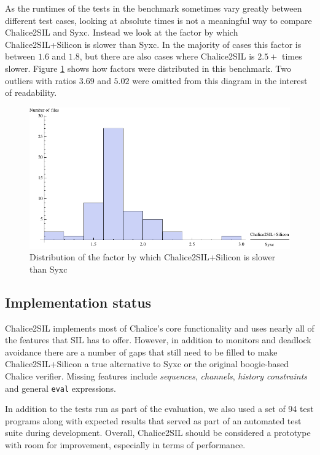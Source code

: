 As the runtimes of the tests in the benchmark sometimes vary greatly between different test cases, looking at absolute times is not a meaningful way to compare Chalice2SIL and Syxc. 
Instead we look at the factor by which Chalice2SIL+Silicon is slower than Syxc. 
In the majority of cases this factor is between $1.6$ and $1.8$, but there are also cases where Chalice2SIL is $2.5+$ times slower.
Figure \ref{fig:full-ratio-distribution} shows how factors were distributed in this benchmark. 
Two outliers with ratios $3.69$ and $5.02$ were omitted from this diagram in the interest of readability.

\begin{figure}
\includegraphics[width=145mm]{src/data/full-ratio-distribution.pdf}
\caption{Distribution of the factor by which Chalice2SIL+Silicon is slower than Syxc}\label{fig:full-ratio-distribution}
\end{figure}

\subsection{Implementation status}
Chalice2SIL implements most of Chalice's core functionality and uses nearly all of the features that SIL has to offer.
However, in addition to monitors and deadlock avoidance there are a number of gaps that still need to be filled to make Chalice2SIL+Silicon a true alternative to Syxc or the original boogie-based Chalice verifier.
Missing features include \emph{sequences}, \emph{channels}, \emph{history constraints} and general \lstinline[language=Chalice]!eval! expressions.

In addition to the tests run as part of the evaluation, we also used a set of 94 test programs along with expected results that served as part of an automated test suite during development.
Overall, Chalice2SIL should be considered a prototype with room for improvement, especially in terms of performance. 


